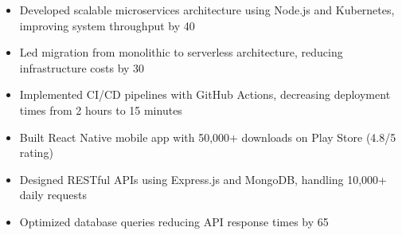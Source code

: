 

\begin{itemize}
\item Developed scalable microservices architecture using Node.js and Kubernetes, improving system throughput by 40%
\item Led migration from monolithic to serverless architecture, reducing infrastructure costs by 30%
\item Implemented CI/CD pipelines with GitHub Actions, decreasing deployment times from 2 hours to 15 minutes
\end{itemize}

\divider


\begin{itemize}
\item Built React Native mobile app with 50,000+ downloads on Play Store (4.8/5 rating)
\item Designed RESTful APIs using Express.js and MongoDB, handling 10,000+ daily requests
\item Optimized database queries reducing API response times by 65%
\end{itemize}